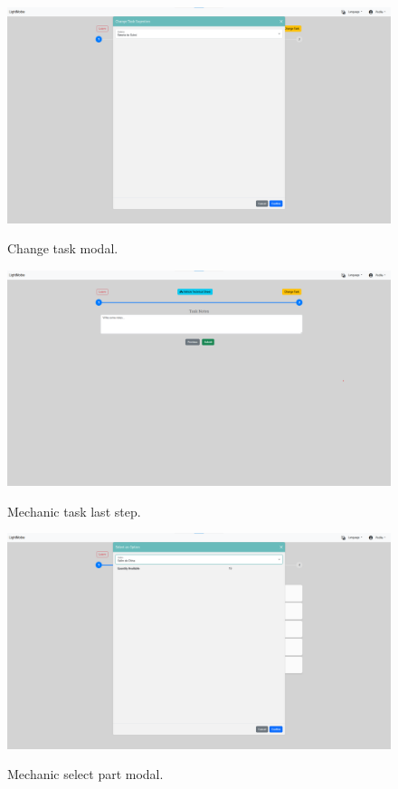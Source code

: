 \begin{figure}[htbp]
  \caption{Change task modal.}
  \centering
  \includegraphics[width=\textwidth]{figs/Implementation/mechanic/MechanicTaskChangeTask}
  \label{fig:MechanicTaskChangeTask}
\end{figure}


\begin{figure}[htbp]
  \caption{Mechanic task last step.}
  \centering
  \includegraphics[width=\textwidth]{figs/Implementation/mechanic/MechanicTaskLastStep}
  \label{fig:MechanicTaskLastStep}
\end{figure}




\begin{figure}[htbp]
  \caption{Mechanic select part modal.}
  \centering
  \includegraphics[width=\textwidth]{figs/Implementation/mechanic/MechanicEvaluationSelectTaskWitPart}
  \label{fig:MechanicEvaluationSelectTaskWitPart}
\end{figure}

